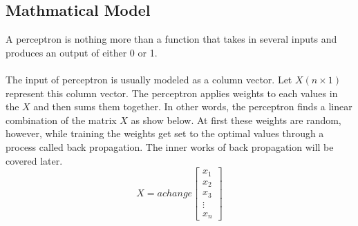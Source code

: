 
\subsection{Mathmatical Model}	
		
A perceptron is nothing more than a function that takes in several inputs and produces an output of either 0 or 1.\\ \\
The input of perceptron is usually modeled as a column vector. Let $X(n\times1)$ represent this column vector. The perceptron applies weights to each values in the $X$ and then sums them together. In other words, the perceptron finds a linear combination of the matrix $X$ as show below. At first these weights are random, however, while training the weights get set to the optimal values through a process called back propagation. The inner works of back propagation will be covered later.
$$
X = 
a change 
\begin{bmatrix}
	x_1 \\
	x_2 \\
	x_3 \\
	\vdots \\
	x_n
\end{bmatrix} 
$$
